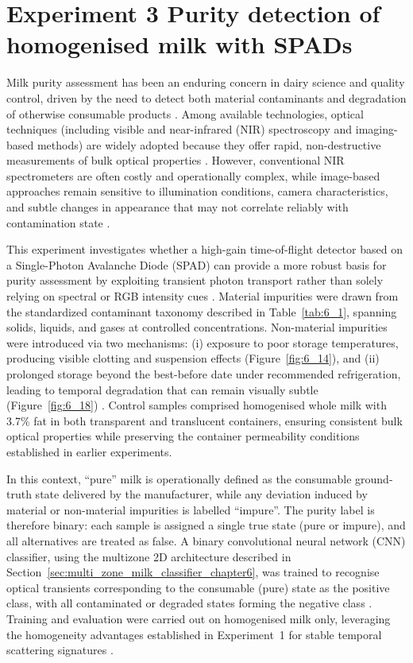 \documentclass[12pt,a4paper,oneside]{report}
\let\oldsection\section
\renewcommand{\section}{\clearpage\oldsection}
\begin{document}
\section{Experiment 3 Purity detection of homogenised milk with SPADs}
\label{sec:experiment_3_chapter6}

Milk purity assessment has been an enduring concern in dairy science and quality control, driven by the need to detect both material contaminants and degradation of otherwise consumable products \cite{walstra1999,goodman1986}. Among available technologies, optical techniques (including visible and near-infrared (NIR) spectroscopy and imaging-based methods) are widely adopted because they offer rapid, non-destructive measurements of bulk optical properties \cite{aernouts2015,melfsen2012,joolaei2025}. However, conventional NIR spectrometers are often costly and operationally complex, while image-based approaches remain sensitive to illumination conditions, camera characteristics, and subtle changes in appearance that may not correlate reliably with contamination state \cite{sun2009,chandra2024}.

This experiment investigates whether a high-gain time-of-flight detector based on a Single-Photon Avalanche Diode (SPAD) can provide a more robust basis for purity assessment by exploiting transient photon transport rather than solely relying on spectral or RGB intensity cues \cite{nielsen2013,gyongy2021}. Material impurities were drawn from the standardized contaminant taxonomy described in Table~\ref{tab:6_1}, spanning solids, liquids, and gases at controlled concentrations. Non-material impurities were introduced via two mechanisms: (i) exposure to poor storage temperatures, producing visible clotting and suspension effects (Figure~\ref{fig:6_14}), and (ii) prolonged storage beyond the best-before date under recommended refrigeration, leading to temporal degradation that can remain visually subtle (Figure~\ref{fig:6_18}) \cite{lott2023,burgwald1947}. Control samples comprised homogenised whole milk with 3.7\% fat in both transparent and translucent containers, ensuring consistent bulk optical properties while preserving the container permeability conditions established in earlier experiments.

In this context, ``pure'' milk is operationally defined as the consumable ground-truth state delivered by the manufacturer, while any deviation induced by material or non-material impurities is labelled ``impure''. The purity label is therefore binary: each sample is assigned a single true state (pure or impure), and all alternatives are treated as false. A binary convolutional neural network (CNN) classifier, using the multizone 2D architecture described in Section~\ref{sec:multi_zone_milk_classifier_chapter6}, was trained to recognise optical transients corresponding to the consumable (pure) state as the positive class, with all contaminated or degraded states forming the negative class \cite{lecun1998,bishop2006}. Training and evaluation were carried out on homogenised milk only, leveraging the homogeneity advantages established in Experiment~1 for stable temporal scattering signatures \cite{walstra1999,michalski2007,aernouts2015}.
\end{document}
